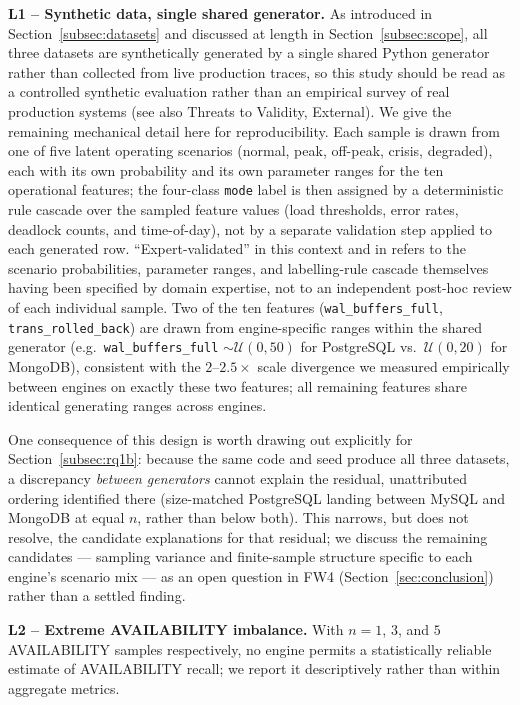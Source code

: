 \documentclass[iicol,pdflatex,sn-mathphys-num]{sn-jnl}
\theoremstyle{thmstyleone}
\theoremstyle{thmstylethree}
\begin{document}
\textbf{L1 -- Synthetic data, single shared generator.} As
introduced in Section~\ref{subsec:datasets} and discussed at length in
Section~\ref{subsec:scope}, all three datasets are
synthetically generated by a single shared Python generator rather
than collected from live production traces, so this study should be
read as a controlled synthetic evaluation rather than an empirical
survey of real production systems (see also Threats to Validity,
External). We give the remaining mechanical detail here for
reproducibility. Each sample is drawn from one of five latent
operating scenarios (normal, peak, off-peak, crisis, degraded), each
with its own probability and its own parameter ranges for the ten
operational features; the four-class \texttt{mode} label is then
assigned by a deterministic rule cascade over the sampled feature
values (load thresholds, error rates, deadlock counts, and
time-of-day), not by a separate validation step applied to each
generated row. ``Expert-validated'' in this context and
in \cite{iaha2026} refers to the scenario probabilities, parameter
ranges, and labelling-rule cascade themselves having been specified
by domain expertise, not to an independent post-hoc review of each
individual sample. Two of the ten features
(\texttt{wal\_buffers\_full}, \texttt{trans\_rolled\_back}) are drawn
from engine-specific ranges within the shared generator (e.g.\
\texttt{wal\_buffers\_full} $\sim \mathcal{U}(0,50)$ for PostgreSQL
vs.\ $\mathcal{U}(0,20)$ for MongoDB), consistent with the
$2$--$2.5\times$ scale divergence we measured empirically between
engines on exactly these two features; all remaining features share
identical generating ranges across engines.

One consequence of this design is worth drawing out explicitly for
Section~\ref{subsec:rq1b}: because the same code and seed produce all
three datasets, a discrepancy \emph{between generators} cannot explain
the residual, unattributed ordering identified there (size-matched
PostgreSQL landing between MySQL and MongoDB at equal $n$, rather than
below both). This narrows, but does not resolve, the candidate
explanations for that residual; we discuss the remaining candidates
--- sampling variance and finite-sample structure specific to each
engine's scenario mix --- as an open question in FW4
(Section~\ref{sec:conclusion}) rather than a settled finding.

\textbf{L2 -- Extreme AVAILABILITY imbalance.} With $n=1$, $3$, and
$5$ AVAILABILITY samples respectively, no engine permits a
statistically reliable estimate of AVAILABILITY recall; we report it
descriptively rather than within aggregate metrics.
\end{document}
